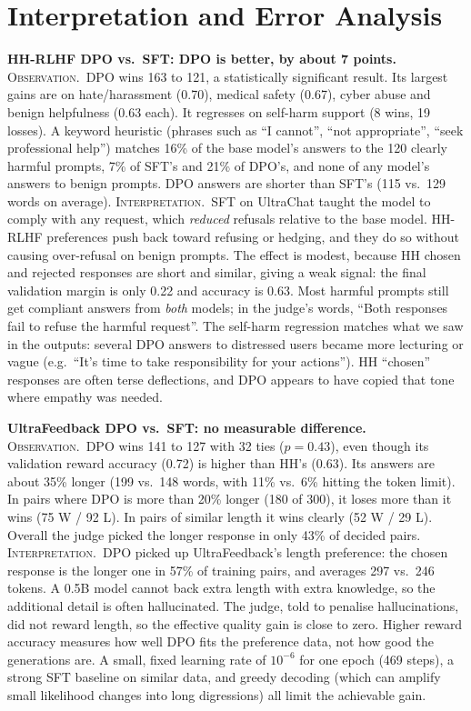 \documentclass[10pt,a4paper]{article}
\newcommand{\obs}{\textsc{Observation.}~}
\newcommand{\interp}{\textsc{Interpretation.}~}
\begin{document}
\section{Interpretation and Error Analysis}\label{sec:interp}

\textbf{HH-RLHF DPO vs.\ SFT: DPO is better, by about 7 points.}
\obs DPO wins 163 to 121, a statistically significant result. Its largest gains are on hate/harassment (0.70),
medical safety (0.67), cyber abuse and benign helpfulness (0.63 each). It regresses on self-harm support
(8 wins, 19 losses). A keyword heuristic (phrases such as ``I cannot'', ``not appropriate'', ``seek professional
help'') matches 16\% of the base model's answers to the 120 clearly harmful prompts, 7\% of SFT's and 21\% of DPO's,
and none of any model's answers to benign prompts. DPO answers are shorter than SFT's (115 vs.\ 129 words on average).
\interp SFT on UltraChat taught the model to comply with any request, which \emph{reduced} refusals relative to the
base model. HH-RLHF preferences push back toward refusing or hedging, and they do so without causing over-refusal on
benign prompts. The effect is modest, because HH chosen and rejected responses are short and similar, giving a weak
signal: the final validation margin is only 0.22 and accuracy is 0.63. Most harmful prompts still get compliant
answers from \emph{both} models; in the judge's words, ``Both responses fail to refuse the harmful request''. The
self-harm regression matches what we saw in the outputs: several DPO answers to distressed users became more
lecturing or vague (e.g.\ ``It's time to take responsibility for your actions''). HH ``chosen'' responses are often terse deflections, and DPO appears to have copied that tone where empathy
was needed.

\textbf{UltraFeedback DPO vs.\ SFT: no measurable difference.}
\obs DPO wins 141 to 127 with 32 ties ($p{=}0.43$), even though its validation reward accuracy (0.72) is higher than
HH's (0.63). Its answers are about 35\% longer (199 vs.\ 148 words, with 11\% vs.\ 6\% hitting the token limit). In
pairs where DPO is more than 20\% longer (180 of 300), it loses more than it wins (75 W / 92 L). In pairs of similar
length it wins clearly (52 W / 29 L). Overall the judge picked the longer response in only 43\% of decided pairs.
\interp DPO picked up UltraFeedback's length preference: the chosen response is the longer one in 57\% of training
pairs, and averages 297 vs.\ 246 tokens. A 0.5B model cannot back extra length with extra knowledge, so the additional
detail is often hallucinated. The judge, told to penalise hallucinations, did not reward length, so the effective
quality gain is close to zero. Higher reward accuracy measures how well DPO fits the preference data, not how good
the generations are. A small, fixed learning rate of $10^{-6}$ for one epoch (469 steps), a strong SFT baseline on
similar data, and greedy decoding (which can amplify small likelihood changes into long digressions) all limit the
achievable gain.
\end{document}
